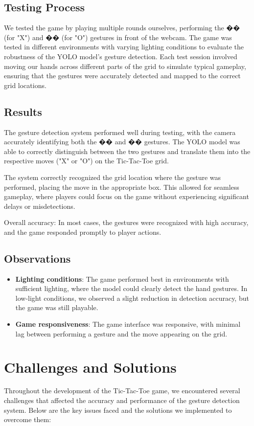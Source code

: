 \documentclass[a4paper,12pt]{article}
\begin{document}
\subsection{Testing Process}
We tested the game by playing multiple rounds ourselves, performing the �� (for "X") and �� (for "O") gestures in front of the webcam. The game was tested in different environments with varying lighting conditions to evaluate the robustness of the YOLO model's gesture detection. Each test session involved moving our hands across different parts of the grid to simulate typical gameplay, ensuring that the gestures were accurately detected and mapped to the correct grid locations.

\subsection{Results}
The gesture detection system performed well during testing, with the camera accurately identifying both the �� and �� gestures. The YOLO model was able to correctly distinguish between the two gestures and translate them into the respective moves ("X" or "O") on the Tic-Tac-Toe grid.

The system correctly recognized the grid location where the gesture was performed, placing the move in the appropriate box. This allowed for seamless gameplay, where players could focus on the game without experiencing significant delays or misdetections.

Overall accuracy: In most cases, the gestures were recognized with high accuracy, and the game responded promptly to player actions.

\subsection{Observations}
\begin{itemize}
    \item \textbf{Lighting conditions}: The game performed best in environments with sufficient lighting, where the model could clearly detect the hand gestures. In low-light conditions, we observed a slight reduction in detection accuracy, but the game was still playable.
    \item \textbf{Game responsiveness}: The game interface was responsive, with minimal lag between performing a gesture and the move appearing on the grid.
\end{itemize}

\section{Challenges and Solutions}
Throughout the development of the Tic-Tac-Toe game, we encountered several challenges that affected the accuracy and performance of the gesture detection system. Below are the key issues faced and the solutions we implemented to overcome them:
\end{document}
